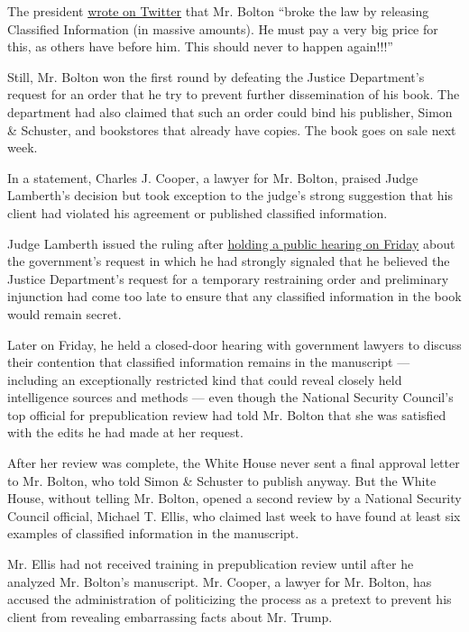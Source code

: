 The president
\href{https://twitter.com/realDonaldTrump/status/1274353054117236738}{wrote
on Twitter} that Mr. Bolton ``broke the law by releasing Classified
Information (in massive amounts). He must pay a very big price for this,
as others have before him. This should never to happen again!!!''

Still, Mr. Bolton won the first round by defeating the Justice
Department's request for an order that he try to prevent further
dissemination of his book. The department had also claimed that such an
order could bind his publisher, Simon \& Schuster, and bookstores that
already have copies. The book goes on sale next week.

In a statement, Charles J. Cooper, a lawyer for Mr. Bolton, praised
Judge Lamberth's decision but took exception to the judge's strong
suggestion that his client had violated his agreement or published
classified information.

Judge Lamberth issued the ruling after
\href{https://www.nytimes.com/2020/06/19/us/politics/john-bolton-book-hearing.html}{holding
a public hearing on Friday} about the government's request in which he
had strongly signaled that he believed the Justice Department's request
for a temporary restraining order and preliminary injunction had come
too late to ensure that any classified information in the book would
remain secret.

Later on Friday, he held a closed-door hearing with government lawyers
to discuss their contention that classified information remains in the
manuscript --- including an exceptionally restricted kind that could
reveal closely held intelligence sources and methods --- even though the
National Security Council's top official for prepublication review had
told Mr. Bolton that she was satisfied with the edits he had made at her
request.

After her review was complete, the White House never sent a final
approval letter to Mr. Bolton, who told Simon \& Schuster to publish
anyway. But the White House, without telling Mr. Bolton, opened a second
review by a National Security Council official, Michael T. Ellis, who
claimed last week to have found at least six examples of classified
information in the manuscript.

Mr. Ellis had not received training in prepublication review until after
he analyzed Mr. Bolton's manuscript. Mr. Cooper, a lawyer for Mr.
Bolton, has accused the administration of politicizing the process as a
pretext to prevent his client from revealing embarrassing facts about
Mr. Trump.

